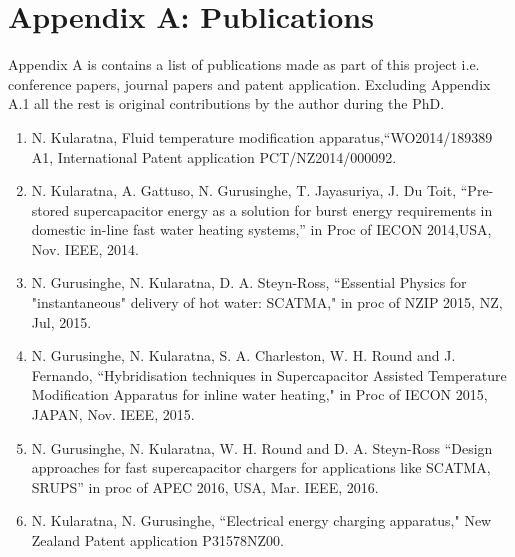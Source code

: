 \chapter*{\textbf{Appendix A: Publications}}

\label{ap:publications}

Appendix A is contains a list of publications made as part of this project i.e. conference papers,
journal papers and patent application. Excluding Appendix A.1 all the rest is original contributions by the author during the PhD.\\

\begin{enumerate}[label=\bfseries A \arabic*.]
\item N. Kularatna, Fluid temperature modification apparatus,``WO2014/189389 A1, International Patent application PCT/NZ2014/000092.\\

\item N. Kularatna, A. Gattuso, N. Gurusinghe, T. Jayasuriya, J. Du Toit, ``Pre-stored supercapacitor energy as a solution for burst energy requirements in domestic in-line fast water heating systems,” in Proc of IECON 2014,USA, Nov. IEEE, 2014.\\

\item N. Gurusinghe, N. Kularatna, D. A. Steyn-Ross, ``Essential Physics for "instantaneous" delivery of hot water: SCATMA," in proc of NZIP 2015, NZ, Jul, 2015.\\

\item N. Gurusinghe, N. Kularatna, S. A. Charleston, W. H. Round and J. Fernando, ``Hybridisation techniques in Supercapacitor Assisted Temperature Modification Apparatus for inline water heating," in Proc of IECON 2015, JAPAN, Nov. IEEE, 2015.\\

\item N. Gurusinghe, N. Kularatna, W. H. Round and D. A. Steyn-Ross ``Design approaches for fast supercapacitor chargers for applications like SCATMA, SRUPS” in proc of APEC 2016, USA, Mar. IEEE, 2016.\\

\item N. Kularatna, N. Gurusinghe, ``Electrical energy charging apparatus," New Zealand Patent application P31578NZ00.\\


\end{enumerate}

	
	
	
	

	
	




